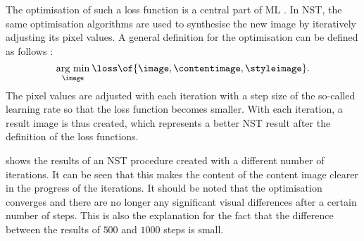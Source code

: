 The optimisation of such a loss function \loss{} is a central part of \gls{ML} \cite{Alp2020}. In \gls{NST}, the same optimisation algorithms are used to synthesise the new image \image{} by iteratively adjusting its pixel values. A general definition for the optimisation can be defined as follows \cite{GEB2016}:
\begin{equation*}
	\argmin{\image}{\loss\of{\image\eqcommasep \contentimage\eqcommasep \styleimage}} \eqtextdot
\end{equation*} 
The pixel values are adjusted with each iteration with a step size of the so-called learning rate so that the loss function becomes smaller. With each iteration, a result image is thus created, which represents a better \gls{NST} result after the definition of the loss functions.
 
 shows the results of an \gls{NST} procedure created with a different number of iterations. It can be seen that this makes the content of the content image clearer in the progress of the iterations. It should be noted that the optimisation converges and there are no longer any significant visual differences after a certain number of steps. This is also the explanation for the fact that the difference between the results of $500$ and $1000$ steps is small. 

